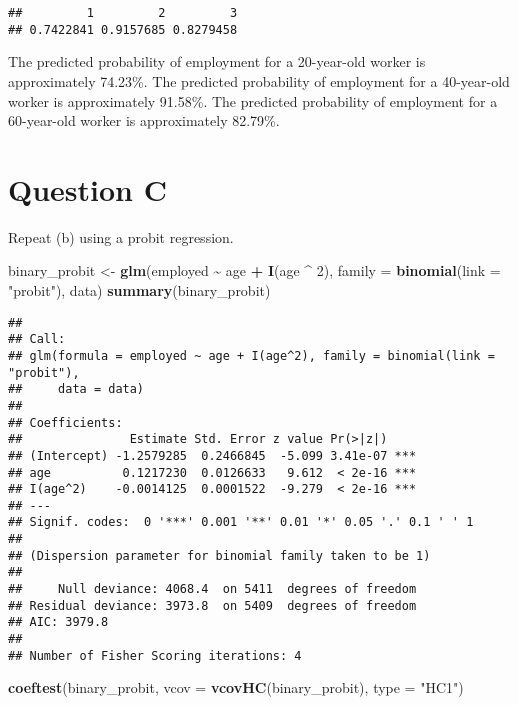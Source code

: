 \documentclass[
]{article}
\newenvironment{Shaded}{\begin{snugshade}}{\end{snugshade}}
\newcommand{\AttributeTok}[1]{\textcolor[rgb]{0.13,0.29,0.53}{#1}}
\newcommand{\DecValTok}[1]{\textcolor[rgb]{0.00,0.00,0.81}{#1}}
\newcommand{\FunctionTok}[1]{\textcolor[rgb]{0.13,0.29,0.53}{\textbf{#1}}}
\newcommand{\NormalTok}[1]{#1}
\newcommand{\OtherTok}[1]{\textcolor[rgb]{0.56,0.35,0.01}{#1}}
\newcommand{\SpecialCharTok}[1]{\textcolor[rgb]{0.81,0.36,0.00}{\textbf{#1}}}
\newcommand{\StringTok}[1]{\textcolor[rgb]{0.31,0.60,0.02}{#1}}
\begin{document}
\begin{verbatim}
##         1         2         3 
## 0.7422841 0.9157685 0.8279458
\end{verbatim}

The predicted probability of employment for a 20-year-old worker is
approximately 74.23\%. The predicted probability of employment for a
40-year-old worker is approximately 91.58\%. The predicted probability
of employment for a 60-year-old worker is approximately 82.79\%.

\hypertarget{question-c}{%
\section{Question C}\label{question-c}}

Repeat (b) using a probit regression.

\begin{Shaded}
\begin{Highlighting}[]
\NormalTok{binary\_probit }\OtherTok{\textless{}{-}} \FunctionTok{glm}\NormalTok{(employed }\SpecialCharTok{\textasciitilde{}}\NormalTok{ age }\SpecialCharTok{+} \FunctionTok{I}\NormalTok{(age }\SpecialCharTok{\^{}} \DecValTok{2}\NormalTok{), }
                     \AttributeTok{family =} \FunctionTok{binomial}\NormalTok{(}\AttributeTok{link =} \StringTok{"probit"}\NormalTok{), }
\NormalTok{                     data)}
\FunctionTok{summary}\NormalTok{(binary\_probit)}
\end{Highlighting}
\end{Shaded}

\begin{verbatim}
## 
## Call:
## glm(formula = employed ~ age + I(age^2), family = binomial(link = "probit"), 
##     data = data)
## 
## Coefficients:
##               Estimate Std. Error z value Pr(>|z|)    
## (Intercept) -1.2579285  0.2466845  -5.099 3.41e-07 ***
## age          0.1217230  0.0126633   9.612  < 2e-16 ***
## I(age^2)    -0.0014125  0.0001522  -9.279  < 2e-16 ***
## ---
## Signif. codes:  0 '***' 0.001 '**' 0.01 '*' 0.05 '.' 0.1 ' ' 1
## 
## (Dispersion parameter for binomial family taken to be 1)
## 
##     Null deviance: 4068.4  on 5411  degrees of freedom
## Residual deviance: 3973.8  on 5409  degrees of freedom
## AIC: 3979.8
## 
## Number of Fisher Scoring iterations: 4
\end{verbatim}

\begin{Shaded}
\begin{Highlighting}[]
\FunctionTok{coeftest}\NormalTok{(binary\_probit, }\AttributeTok{vcov =} \FunctionTok{vcovHC}\NormalTok{(binary\_probit), }\AttributeTok{type =} \StringTok{"HC1"}\NormalTok{)}
\end{Highlighting}
\end{Shaded}
\end{document}
